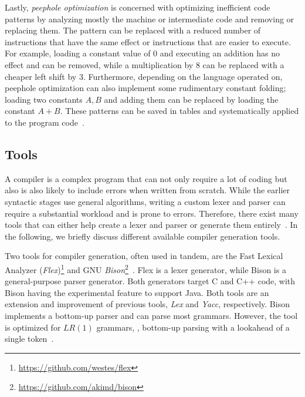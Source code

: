 Lastly, \emph{peephole optimization} is concerned with optimizing inefficient code patterns by analyzing mostly the machine or intermediate code and removing or replacing them. The pattern can be replaced with a reduced number of instructions that have the same effect or instructions that are easier to execute. For example, loading a constant value of $0$ and executing an addition has no effect and can be removed, while a multiplication by $8$ can be replaced with a cheaper left shift by $3$. Furthermore, depending on the language operated on, peephole optimization can also implement some rudimentary constant folding; loading two constants $A, B$ and adding them can be replaced by loading the constant $A + B$. These patterns can be saved in tables and systematically applied to the program code~\cite{McKe65,TvS82}.

\subsection{Tools}
\label{sec:background_compilerTools}
A compiler is a complex program that can not only require a lot of coding but also is also likely to include errors when written from scratch. While the earlier syntactic stages use general algorithms, writing a custom lexer and parser can require a substantial workload and is prone to errors. Therefore, there exist many tools that can either help create a lexer and parser or generate them entirely~\cite{PaFi11, ZLY17}. In the following, we briefly discuss different available compiler generation tools.

Two tools for compiler generation, often used in tandem, are the Fast Lexical Analyzer (\emph{Flex})\footnote{\url{https://github.com/westes/flex}} and GNU \emph{Bison}\footnote{\url{https://github.com/akimd/bison}}~\cite{DoSt99}.
Flex is a lexer generator, while Bison is a general-purpose parser generator. Both generators target C and C++ code, with Bison having the experimental feature to support Java.
Both tools are an extension and improvement of previous tools, \emph{Lex} and \emph{Yacc}, respectively.
Bison implements a bottom-up parser and can parse most grammars. However, the tool is optimized for $LR(1)$ grammars, \ie, bottom-up parsing with a lookahead of a single token~\cite{ZLY17,Aaby03,DoSt99}.

